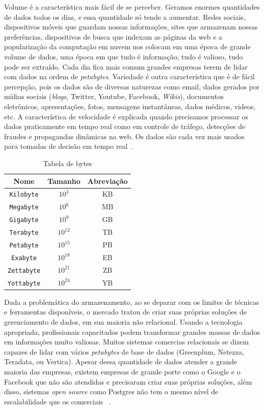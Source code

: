 Volume é a característica mais fácil de se perceber. Geramos enormes quantidades de dados todos os dias, e essa quantidade só tende a aumentar. Redes sociais, dispositivos móveis que guardam nossas informações, sites que armazenam nossas preferências, dispositivos de busca que indexam as páginas da web e a popularização da computação em nuvem nos colocam em uma época de grande volume de dados, uma época em que tudo é informação, tudo é valioso, tudo pode ser extraído. Cada dia fica mais comum grandes empresas terem de lidar com dados na ordem de \textit{petabytes}. Variedade é outra característica que é de fácil percepção, pois os dados são de diversas naturezas como email, dados gerados por mídias sociais (\textit{blogs}, Twitter, Youtube, Facebook, \textit{Wikis}), documentos eletrônicos, apresentações, fotos, mensagens instantâneas, dados médicos, videos, etc. A característica de velocidade é explicada quando precisamos processar os dados praticamente em tempo real como em controle de tráfego, detecções de fraudes e propagandas dinâmicas na web. Os dados são cada vez mais usados para tomadas de decisão em tempo real~\cite{promiseperil}.

\begin{table}
	\caption{Tabela de bytes}
	\begin{center}
	\begin{tabular}{ccc}
		\hline
			\textbf{Nome} & \textbf{Tamanho} & \textbf{Abreviação} \\
		\hline
			\texttt{Kilobyte}	& $10^3$ & KB \\
			\texttt{Megabyte}	& $10^6$ & MB \\
			\texttt{Gigabyte}	& $10^9$ & GB \\
			\texttt{Terabyte}	& $10^{12}$ & TB \\
			\texttt{Petabyte}	& $10^{15}$ & PB \\
			\texttt{Exabyte}	& $10^{18}$ & EB \\
			\texttt{Zettabyte}	& $10^{21}$ & ZB \\
			\texttt{Yottabyte}	& $10^{24}$ & YB \\
		\hline
	\end {tabular}
	\end{center}
	\label{tab:bytes}
\end{table}

Dada a problemática do armazenamento, ao se deparar com os limites de técnicas e ferramentas disponíveis, o mercado tratou de criar suas próprias soluções de gerenciamento de dados, em sua maioria não relacional. Usando a tecnologia apropriada, profissionais capacitados podem transformar grandes massas de dados em informações muito valiosas. Muitos sistemas comercias relacionais se dizem capazes de lidar com vários \textit{petabytes} de base de dados (Greenplum, Netezza, Teradata, ou Vertica). Apesar dessa quantidade de dados atender a grande maioria das empresas, existem empresas de grande porte como o Google e o Facebook que não são atendidas e precisaram criar suas próprias soluções, além disso, sistemas \textit{open source} como Postgres  não tem o mesmo nível de escalabilidade que os comerciais ~\cite{fromdbtobigdata}.

